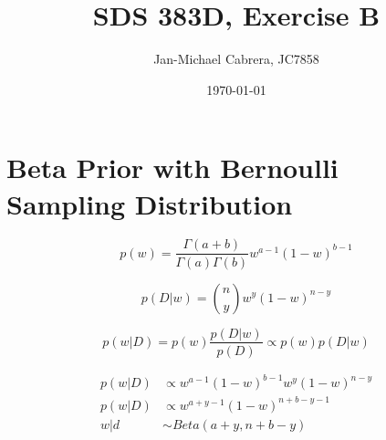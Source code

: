 \documentclass[12pt]{article}%
\begin{document}
      \title{SDS 383D, Exercise B}
      \author{Jan-Michael Cabrera, JC7858}
      \date{\today}
      \maketitle


      \section*{Beta Prior with Bernoulli Sampling Distribution}

            \begin{equation}\label{eq:prior}
                  p(w) = \frac{\Gamma(a+b)}{\Gamma(a)\Gamma(b)}w^{a-1}(1-w)^{b-1}
            \end{equation}

            \begin{equation}\label{eq:likelihood}
                  p(D|w) = \binom{n}{y} w^y (1 - w)^{n-y}
            \end{equation}

            \begin{equation}\label{eq:posterior_1}
                  p(w|D) = p(w) \frac{p(D|w)}{p(D)} \propto p(w) p(D|w)
            \end{equation}

            \begin{align}
                  p(w|D) &\propto w^{a-1}(1-w)^{b-1}w^y(1-w)^{n-y} \\
                  p(w|D) &\propto w^{a+y-1}(1-w)^{n+b-y-1} \\
                  w|d &\sim Beta(a+y, n+b-y)
            \end{align}
\end{document}
